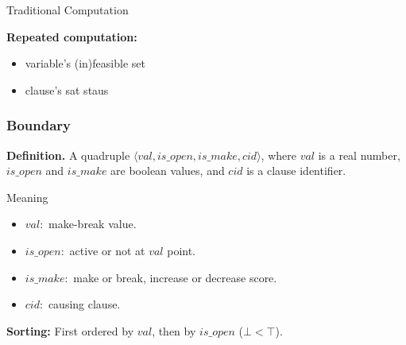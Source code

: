 \begin{frame}{Traditional Computation}
    \begin{algorithm}[H]
        \SetAlgoLined
    \end{algorithm}
    
    \vspace{0.4cm}
    \textbf{Repeated computation:}\\
    \begin{itemize}
        \item variable's (in)feasible set
        \item clause's sat staus
    \end{itemize}

\end{frame}

\begin{frame} 
    \frametitle{Boundary}
    \textbf{Definition.} A quadruple $\langle \mathit{val}, \mathit{is\_open}, \mathit{is\_make}, \mathit{cid}\rangle$, where $\mathit{val}$ is a real number, $\mathit{is\_open}$ and $\mathit{is\_make}$ are boolean values, and $\mathit{cid}$ is a clause identifier.
    \vspace{0.4cm}
    \begin{alertblock}{Meaning}
        \begin{itemize}
            \item $val:$ make-break value.
            \item $is\_open:$ active or not at $val$ point.
            \item $is\_make:$ make or break, increase or decrease score.
            \item $cid:$ causing clause.
        \end{itemize}
    \end{alertblock}

    \textbf{Sorting:} First ordered by $val$, then by $is\_open$ ($\bot<\top$).
\end{frame}

